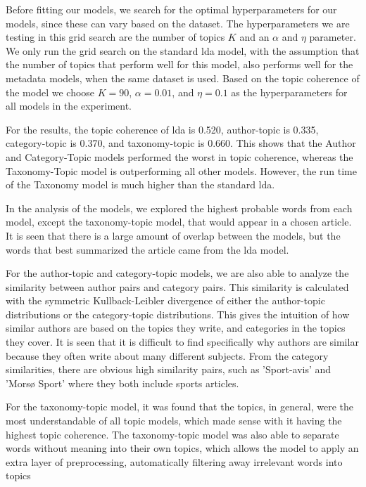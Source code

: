 Before fitting our models, we search for the optimal hyperparameters for our models, since these can vary based on the dataset.
The hyperparameters we are testing in this grid search are the number of topics $K$ and an $\alpha$ and $\eta$ parameter.
We only run the grid search on the standard \gls{lda} model, with the assumption that the number of topics that perform well for this model, also performs well for the metadata models, when the same dataset is used.
Based on the topic coherence of the model we choose $K = 90$, $\alpha = 0.01$, and $\eta = 0.1$ as the hyperparameters for all models in the experiment.

For the results, the topic coherence of \gls{lda} is 0.520, author-topic is 0.335, category-topic is 0.370, and taxonomy-topic is 0.660.
This shows that the Author and Category-Topic models performed the worst in topic coherence, whereas the Taxonomy-Topic model is outperforming all other models.
However, the run time of the Taxonomy model is much higher than the standard \gls{lda}.

In the analysis of the models, we explored the highest probable words from each model, except the taxonomy-topic model, that would appear in a chosen article.
It is seen that there is a large amount of overlap between the models, but the words that best summarized the article came from the \gls{lda} model.

For the author-topic and category-topic models, we are also able to analyze the similarity between author pairs and category pairs.
This similarity is calculated with the symmetric Kullback-Leibler divergence of either the author-topic distributions or the category-topic distributions.
This gives the intuition of how similar authors are based on the topics they write, and categories in the topics they cover.
It is seen that it is difficult to find specifically why authors are similar because they often write about many different subjects.
From the category similarities, there are obvious high similarity pairs, such as 'Sport-avis' and 'Morsø Sport' where they both include sports articles.

For the taxonomy-topic model, it was found that the topics, in general, were the most understandable of all topic models, which made sense with it having the highest topic coherence.
The taxonomy-topic model was also able to separate words without meaning into their own topics, which allows the model to apply an extra layer of preprocessing, automatically filtering away irrelevant words into topics


